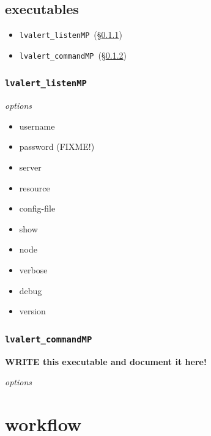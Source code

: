 \documentclass{article}
\newcommand{\lvalertListenMP}{\texttt{lvalert\_listenMP}~}
\newcommand{\lvalertCommandMP}{\texttt{lvalert\_commandMP}~}
\begin{document}

\subsection{executables}
\label{sec: executables}

\begin{itemize}
    \item{\lvalertListenMP (\S\ref{sec: lvalertListenMP})}
    \item{\lvalertCommandMP (\S\ref{sec: lvalertCommandMP})}
\end{itemize}


\subsubsection{\lvalertListenMP}
\label{sec: lvalertListenMP}

\noindent
\textit{options}

\begin{itemize}
    \item{username}
    \item{password (FIXME!)}
    \item{server}
    \item{resource}
    \item{config-file}
    \item{show}
    \item{node}
    \item{verbose}
    \item{debug}
    \item{version}
\end{itemize}


\subsubsection{\lvalertCommandMP}
\label{sec: lvalertCommandMP}

\textbf{WRITE this executable and document it here!}

\noindent
\textit{options}


\section{workflow}
\label{sec: workflow}
\end{document}
